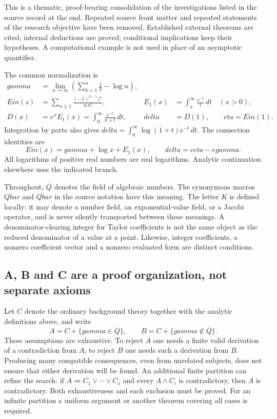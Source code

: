 \documentclass[11pt,a4paper]{article}
\newcommand{\QB}{\overline{\mathbb Q}}
\newcommand{\Qbar}{\overline{\mathbb Q}}
\DeclareMathOperator{\Ein}{Ein}
\theoremstyle{definition}
\theoremstyle{remark}
\theoremstyle{plain}
\numberwithin{equation}{section}
\def\Ein{Ein}\def\gamma{gamma}\def\delta{delta}\def\eta{eta}%
\def\Qbar{Qbar}\def\QB{Qbar}\def\mathbb#1{#1}%
\begin{document}
This is a thematic, proof-bearing consolidation of the investigations
listed in the source record at the end. Repeated source front matter and
repeated statements of the research objective have been removed.
Established external theorems are cited; internal deductions are proved;
conditional implications keep their hypotheses. A computational example
is not used in place of an asymptotic quantifier.

The common normalization is
\begin{align}
 \gamma&=\lim_{n\to\infty}\left(\sum_{k=1}^{n}\frac1k-\log n\right),\\
 \Ein(z)&=\sum_{n\ge1}\frac{(-1)^{n-1}z^n}{n\,n!},
 &E_1(x)&=\int_x^\infty\frac{e^{-t}}{t}\,dt\quad(x>0),\\
 D(x)&=e^xE_1(x)=\int_0^\infty\frac{e^{-t}}{x+t}\,dt,
 &\delta&=D(1),\qquad \eta=\Ein(1).
\end{align}
Integration by parts also gives
$\delta=\int_0^\infty\log(1+t)e^{-t}\,dt$. The connection identities are
\begin{equation}\label{int:connection}
 \Ein(x)=\gamma+\log x+E_1(x),\qquad
 \delta=e\eta-e\gamma.
\end{equation}
All logarithms of positive real numbers are real logarithms.
Analytic continuation elsewhere uses the indicated branch.

Throughout, $\overline{\mathbb Q}$ denotes the field of algebraic numbers.
The synonymous macros $\QB$ and $\Qbar$ in the source notation have this
meaning. The letter $K$ is defined locally: it may denote a number field,
an exponential-value field, or a Jacobi operator, and is never silently
transported between these meanings. A denominator-clearing integer for
Taylor coefficients is not the same object as the reduced denominator
of a value at a point. Likewise, integer coefficients, a nonzero
coefficient vector and a nonzero evaluated form are distinct conditions.

\subsection{A, B and C are a proof organization, not separate axioms}
Let $C$ denote the ordinary background theory together with the analytic
definitions above, and write
\[
 A=C+\{\gamma\in\overline{\mathbb Q}\},\qquad
 B=C+\{\gamma\notin\overline{\mathbb Q}\}.
\]
These assumptions are exhaustive. To reject $A$ one needs a finite valid
derivation of a contradiction from $A$; to reject $B$ one needs such a
derivation from $B$. Producing many compatible consequences, even from
unrelated subjects, does not ensure that either derivation will be found.
An additional finite partition can refine the search: if
$A\Rightarrow C_1\lor\cdots\lor C_s$ and every $A\land C_i$ is
contradictory, then $A$ is contradictory. Both exhaustiveness and each
exclusion must be proved. For an infinite partition a uniform argument
or another theorem covering all cases is required.
\end{document}
